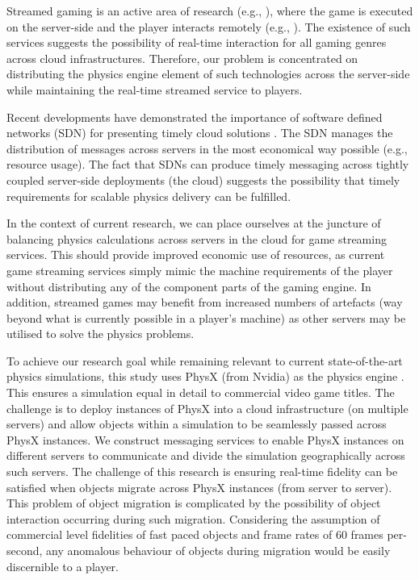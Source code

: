 Streamed gaming is an active area of research (e.g., \cite{GARCIAVALLS}), where the game is executed on the server-side and the player interacts remotely (e.g., \cite{PSNOW, NVidiaGameStream}). The existence of such services suggests the possibility of real-time interaction for all gaming genres across cloud infrastructures. Therefore, our problem is concentrated on distributing the physics engine element of such technologies across the server-side while maintaining the real-time streamed service to players.

Recent developments have demonstrated the importance of software defined networks (SDN) for presenting timely cloud solutions \cite{Wang, Kumar}. The SDN manages the distribution of messages across servers in the most economical way possible (e.g., resource usage). The fact that SDNs can produce timely messaging across tightly coupled server-side deployments (the cloud) suggests the possibility that timely requirements for scalable physics delivery can be fulfilled.

In the context of current research, we can place ourselves at the juncture of balancing physics calculations across servers in the cloud for game streaming services. This should provide improved economic use of resources, as current game streaming services simply mimic the machine requirements of the player without distributing any of the component parts of the gaming engine. In addition, streamed games may benefit from increased numbers of artefacts (way beyond what is currently possible in a player's machine) as other servers may be utilised to solve the physics problems.

To achieve our research goal while remaining relevant to current state-of-the-art physics simulations, this study uses PhysX (from Nvidia) as the physics engine \cite{PhysX}. This ensures a simulation equal in detail to commercial video game titles. The challenge is to deploy instances of PhysX into a cloud infrastructure (on multiple servers) and allow objects within a simulation to be seamlessly passed across PhysX instances. We construct messaging services to enable PhysX instances on different servers to communicate and divide the simulation geographically across such servers. The challenge of this research is ensuring real-time fidelity can be satisfied when objects migrate across PhysX instances (from server to server). This problem of object migration is complicated by the possibility of object interaction occurring during such migration. Considering the assumption of commercial level fidelities of fast paced objects and frame rates of 60 frames per-second, any anomalous behaviour of objects during migration would be easily discernible to a player. 

